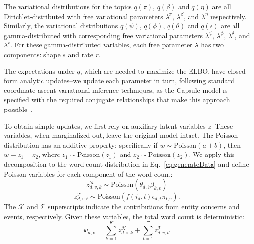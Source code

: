 The variational distributions for the topics $q(\pi)$, $q(\beta)$ and $q(\eta)$ are all Dirichlet-distributed with free variational parameters $\lambda^\pi$, $\lambda^\beta$, and $\lambda^\eta$ respectively.  Similarly, the variational distributions $q(\psi)$, $q(\phi)$, $q(\theta)$ and $q(\epsilon)$ are all gamma-distributed with corresponding free variational parameters $\lambda^\psi$, $\lambda^\phi$, $\lambda^\theta$, and $\lambda^\epsilon$.  For these gamma-distributed variables, each free parameter $\lambda$ has two components: shape $s$ and rate $r$.

The expectations under $q$, which are needed to maximize the ELBO, have closed form analytic updates--we update each parameter in turn, following standard coordinate ascent variational inference techniques, as the Capsule model is specified with the required conjugate relationships that make this approach possible~\cite{Ghahramani:2001}.

To obtain simple updates, we first rely on auxiliary latent variables $z$. These variables, when marginalized out, leave the original model intact. The Poisson distribution has an additive property; specifically if $w \sim \mbox{Poisson}(a+b)$, then $w = z_1 + z_2$, where $z_1 \sim \mbox{Poisson}(z_1)$ and $z_2 \sim \mbox{Poisson}(z_2)$.  We apply this decomposition to the word count distribution in Eq.~\ref{eq:generateData} and define Poisson variables for each component of the word count:
\[ z^\mathcal{K}_{d,v,k} \sim \mbox{Poisson}(\theta_{d,k}\beta_{k,v}) \]
\[ z^\mathcal{T}_{d,v,t} \sim \mbox{Poisson}\left(f(i_d, t) \epsilon_{d,t} \pi_{t,v}\right). \]
The $\mathcal{K}$ and $\mathcal{T}$ superscripts indicate the contributions from entity concerns and events, respectively.  Given these variables, the total word count is deterministic:
\[ w_{d,v} = \sum_{k=1}^K z^\mathcal{K}_{d,v,k} + \sum_{t=1}^T z^\mathcal{T}_{d,v,t}. \]

